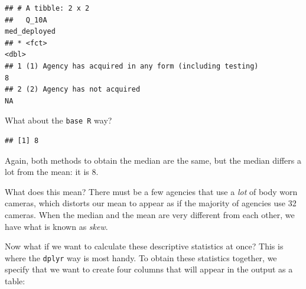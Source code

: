 \documentclass[
]{book}
\newenvironment{Shaded}{\begin{snugshade}}{\end{snugshade}}
\newcommand{\AttributeTok}[1]{\textcolor[rgb]{0.77,0.63,0.00}{#1}}
\newcommand{\CommentTok}[1]{\textcolor[rgb]{0.56,0.35,0.01}{\textit{#1}}}
\newcommand{\ConstantTok}[1]{\textcolor[rgb]{0.00,0.00,0.00}{#1}}
\newcommand{\FunctionTok}[1]{\textcolor[rgb]{0.00,0.00,0.00}{#1}}
\newcommand{\NormalTok}[1]{#1}
\newcommand{\SpecialCharTok}[1]{\textcolor[rgb]{0.00,0.00,0.00}{#1}}
\begin{document}
\begin{verbatim}
## # A tibble: 2 x 2
##   Q_10A                                                   med_deployed
## * <fct>                                                          <dbl>
## 1 (1) Agency has acquired in any form (including testing)            8
## 2 (2) Agency has not acquired                                       NA
\end{verbatim}

What about the \texttt{base\ R} way?

\begin{Shaded}
\end{Shaded}

\begin{verbatim}
## [1] 8
\end{verbatim}

Again, both methods to obtain the median are the same, but the median differs a lot from the mean: it is 8.

What does this mean? There must be a few agencies that use a \emph{lot} of body worn cameras, which distorts our mean to appear as if the majority of agencies use 32 cameras. When the median and the mean are very different from each other, we have what is known as \emph{skew}.

Now what if we want to calculate these descriptive statistics at once? This is where the \texttt{dplyr} way is most handy. To obtain these statistics together, we specify that we want to create four columns that will appear in the output as a table:
\end{document}
